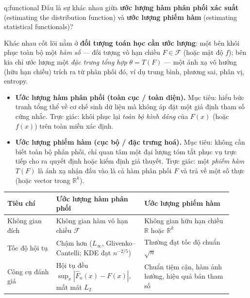 
\begin{cauhoi}{q:functional}
Đâu là sự khác nhau giữa \textbf{ước lượng hàm phân phối xác suất} (estimating the distribution function) và \textbf{ước lượng phiếm hàm} (estimating statistical functionals)?
\end{cauhoi}

\begin{chot}
Khác nhau cốt lõi nằm ở \textbf{đối tượng toán học cần ước lượng}: một bên khôi phục toàn bộ một \emph{hàm số} --- đối tượng vô hạn chiều $F\in\mathcal{F}$ (hoặc mật độ $f$); bên kia chỉ ước lượng một \emph{đặc trưng tổng hợp} $\theta=T(F)$ --- một ánh xạ vô hướng (hữu hạn chiều) trích ra từ phân phối đó, ví dụ trung bình, phương sai, phân vị, entropy.
\end{chot}

\begin{itemize}
\item \textbf{Ước lượng hàm phân phối (toàn cục / toàn diện).} Mục tiêu: hiểu bức tranh tổng thể về cơ chế sinh dữ liệu mà không áp đặt một giả định tham số cứng nhắc. Trực giác: khôi phục lại \emph{toàn bộ hình dáng} của $F(x)$ (hoặc $f(x)$) trên toàn miền xác định.
\item \textbf{Ước lượng phiếm hàm (cục bộ / đặc trưng hoá).} Mục tiêu: không cần biết toàn bộ phân phối, chỉ quan tâm một đại lượng tóm tắt phục vụ trực tiếp cho ra quyết định hoặc kiểm định giả thuyết. Trực giác: một \emph{phiếm hàm} $T(F)$ là ánh xạ nhận đầu vào là cả hàm phân phối $F$ và trả về một số thực (hoặc vector trong $\mathbb{R}^k$).
\end{itemize}

\begin{center}
\begin{tabular}{@{}p{0.20\linewidth}p{0.36\linewidth}p{0.36\linewidth}@{}}
\toprule
\textbf{Tiêu chí} & \textbf{Ước lượng hàm phân phối} & \textbf{Ước lượng phiếm hàm}\\
\midrule
Không gian đích & Không gian hàm vô hạn chiều $\mathcal{F}$ & Không gian hữu hạn chiều $\mathbb{R}$ hoặc $\mathbb{R}^k$\\
Tốc độ hội tụ & Chậm hơn ($L_\infty$, Glivenko--Cantelli; KDE đạt $n^{-2/5}$) & Thường đạt tốc độ chuẩn $\sqrt{n}$\\
Công cụ đánh giá & Hội tụ đều $\sup_x|\widehat F_n(x)-F(x)|$, mất mát $L_2$ & Chuẩn tiệm cận, hàm ảnh hưởng, hiệu quả bán tham số\\
\bottomrule
\end{tabular}
\end{center}

